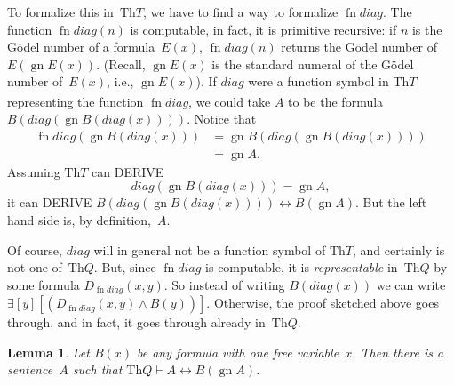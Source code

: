 \documentclass[10pt,a4paper]{article}
\newcommand*{\olup}[1]{\MakeUppercase{#1}}
\theoremstyle{plain}
\newtheorem{lem}[thm]{Lemma}
\theoremstyle{definition}
\theoremstyle{remark}
\newenvironment{explain}{}{}
\newcommand*{\ollabel}[1]{\label{#1}}
\providecommand{\lexists}{\mathord{\exists}}
\providecommand{\Proves}{\mathrel{\vdash}}
\providecommand{\Obj}{}
\providecommand{\Th}{\ensuremath{\mathrm{Th}}}
\providecommand{\num}[1]{\underline{#1}}
\providecommand{\Gn}{\operatorname{gn}}
\providecommand{\gn}{\operatorname{gn}}
\providecommand{\liff}{\mathbin{\leftrightarrow}}
\providecommand{\fn}{\operatorname{fn}}
\begin{document}
\begin{explain}
To formalize this in~$\Th{T}$, we have to find a way to formalize
$\fn{diag}$. The function $\fn{diag}(n)$ is computable, in fact, it is
primitive recursive: if $n$ is the G\"odel number of a
formula~$E(x)$, $\fn{diag}(n)$ returns the G\"odel number
of~$E(\gn{E(x)})$. (Recall, $\gn{E(x)}$ is the standard numeral of
the G\"odel number of~$E(x)$, i.e., $\num{\Gn{E(x)}}$). If
$\Obj{diag}$ were a function symbol in $\Th{T}$ representing the
function $\fn{diag}$, we could take $A$ to be the formula
$B(\Obj{diag}(\gn{B(\Obj{diag}(x))}))$. Notice that
\begin{align*}
\fn{diag}(\Gn{B(\Obj{diag}(x))}) & = 
\Gn{B(\Obj{diag}(\gn{B(\Obj{diag}(x))}))} \\
& = \Gn{A}.
\end{align*}
Assuming $\Th{T}$ can \olup{derive}
\[
\Obj{diag}(\gn{B(\Obj{diag}(x))}) = \gn{A},
\]
it can \olup{derive} $B(\Obj{diag}(\gn{B(\Obj{diag}(x))}))
\liff B(\gn{A})$. But the left hand side is, by
definition,~$A$.

Of course, $\Obj{diag}$ will in general not be a function symbol of
$\Th{T}$, and certainly is not one of~$\Th{Q}$. But, since $\fn{diag}$
is computable, it is \emph{representable} in~$\Th{Q}$ by some formula
$D_{\fn{diag}}(x,y)$. So instead of writing $B(\Obj{diag}(x))$ we
can write $\lexists[y][(D_{\fn{diag}}(x,y) \land B(y))]$. Otherwise,
the proof sketched above goes through, and in fact, it goes through
already in~$\Th{Q}$.
\end{explain}

\begin{lem}
\ollabel{lem:fixed-point} Let $B(x)$ be any formula with one free
variable~$x$. Then there is a sentence~$A$ such that $\Th{Q} \Proves
A \liff B(\gn{A})$.
\end{lem}
\end{document}
